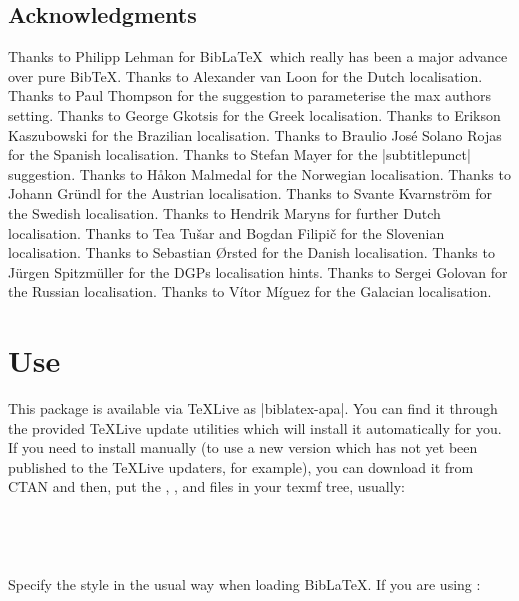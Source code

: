 \documentclass{ltxdockit}
\begin{document}
\subsection{Acknowledgments}

Thanks to Philipp Lehman for Bib\LaTeX\ which really has been a major
advance over pure Bib\TeX. Thanks to Alexander van Loon for the Dutch
localisation. Thanks to Paul Thompson for the suggestion to
parameterise the max authors setting. Thanks to George Gkotsis for the
Greek localisation. Thanks to Erikson Kaszubowski for the Brazilian
localisation. Thanks to Braulio José Solano Rojas for the Spanish
localisation. Thanks to Stefan Mayer for the |subtitlepunct| suggestion.
Thanks to Håkon Malmedal for the Norwegian localisation. Thanks to
Johann Gründl for the Austrian localisation. Thanks to Svante Kvarnström
for the Swedish localisation. Thanks to Hendrik Maryns for further Dutch
localisation. Thanks to Tea Tušar and Bogdan Filipič for the Slovenian
localisation. Thanks to Sebastian Ørsted for the Danish localisation.
Thanks to Jürgen Spitzmüller for the DGPs localisation hints. Thanks to
Sergei Golovan for the Russian localisation. Thanks to Vítor Míguez for the
Galacian localisation.

\section{Use}\label{ref:use}
\label{use}
This package is available via \TeX Live as |biblatex-apa|. You can find it
through the provided \TeX Live update utilities which will install it
automatically for you. If you need to install manually (to use a new
version which has not yet been published to the \TeX Live updaters, for
example), you can download it from CTAN and then, put the ,
, and  files in your texmf tree, usually:\\ 

\noindent{}\\
\\
\\
\\

\noindent Specify the style in the usual way when loading Bib\LaTeX. If you
are using :

\begin{ltxcode}
\usepackage[american]{babel}
\usepackage{csquotes}
\usepackage[style=apa]{biblatex}
\end{ltxcode}
\end{document}
